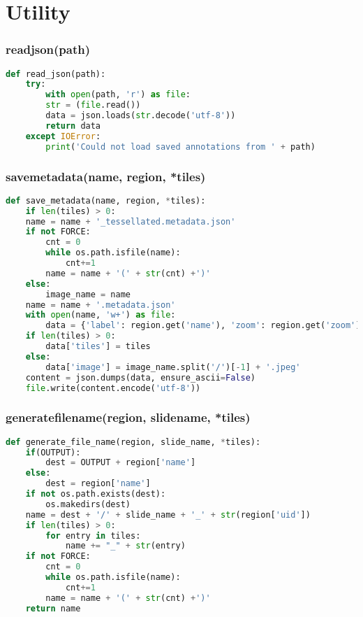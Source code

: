 \section{Utility}

\subsubsection{read{\textunderscore}json(path)}

\begin{lstlisting}[frame=single,language=python]
def read_json(path):
	try:
		with open(path, 'r') as file:
		str = (file.read())
		data = json.loads(str.decode('utf-8'))
		return data
	except IOError:
		print('Could not load saved annotations from ' + path)
\end{lstlisting}


\subsubsection{save{\textunderscore}metadata(name, region, *tiles)}

\begin{lstlisting}[frame=single,language=python]
def save_metadata(name, region, *tiles):
	if len(tiles) > 0:
	name = name + '_tessellated.metadata.json'
	if not FORCE:
		cnt = 0
		while os.path.isfile(name):
			cnt+=1
		name = name + '(' + str(cnt) +')'
	else:
		image_name = name
	name = name + '.metadata.json'
	with open(name, 'w+') as file:
		data = {'label': region.get('name'), 'zoom': region.get('zoom'), 'context': region.get('context')}
	if len(tiles) > 0:
		data['tiles'] = tiles
	else:
		data['image'] = image_name.split('/')[-1] + '.jpeg'
	content = json.dumps(data, ensure_ascii=False)
	file.write(content.encode('utf-8'))
\end{lstlisting}


\subsubsection{generate{\textunderscore}file{\textunderscore}name(region, slide{\textunderscore}name, *tiles)}

\begin{lstlisting}[frame=single,language=python]
def generate_file_name(region, slide_name, *tiles):
	if(OUTPUT):
		dest = OUTPUT + region['name']
	else:
		dest = region['name']
	if not os.path.exists(dest):
		os.makedirs(dest)
	name = dest + '/' + slide_name + '_' + str(region['uid'])
	if len(tiles) > 0:
		for entry in tiles:
			name += "_" + str(entry)
	if not FORCE:
		cnt = 0
		while os.path.isfile(name):
			cnt+=1
		name = name + '(' + str(cnt) +')'
	return name
\end{lstlisting}


